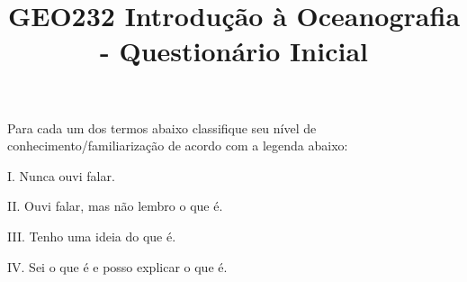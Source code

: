 \documentclass[a4paper,10pt]{article}
\title{GEO232 Introdução à Oceanografia - Questionário Inicial}
\author{\vspace{-10ex}}
\date{\vspace{-10ex}}
\begin{document}
  \maketitle
  \onehalfspace

%

Para cada um dos termos abaixo classifique seu nível de conhecimento/familiarização de acordo com a legenda abaixo:

\begin{multicols}{2}

I. Nunca ouvi falar.

II. Ouvi falar, mas não lembro o que é.

III. Tenho uma ideia do que é.

IV. Sei o que é e posso explicar o que é.

\end{multicols}
\end{document}

